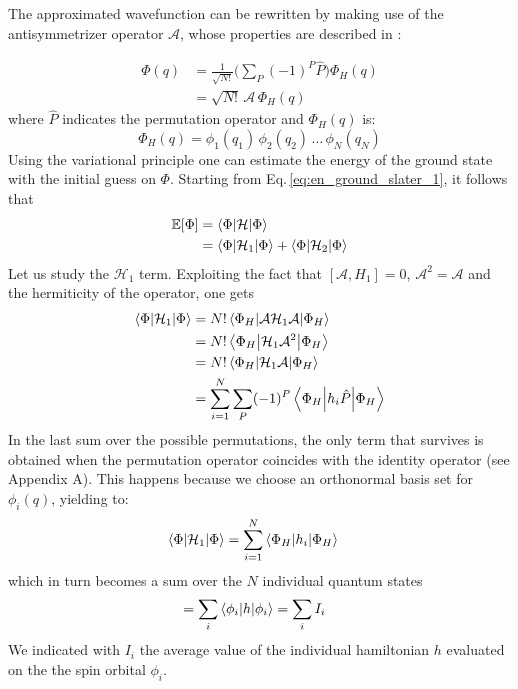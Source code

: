 The approximated wavefunction can be rewritten by making use of the antisymmetrizer operator $\mathcal{A}$, whose properties are described in \cite{bransden}:

\begin{equation}
\begin{aligned}
    \Phi(q) &= \frac{1}{\sqrt{N!}}\bigg(\sum_P (-1)^P \hat{P} \bigg) \Phi_H(q) \\
     &= \sqrt{N!} \, \mathcal{A} \, \Phi_H(q)
\end{aligned}
\label{eq:slater_determinant}
\end{equation}
where $\hat{P}$ indicates the permutation operator and $\Phi_H(q)$ is:
\begin{equation*}
    \Phi_H(q) = \phi_1(q_1) \, \phi_2(q_2) \, \dots \, \phi_N(q_N)  
\end{equation*}
Using the variational principle one can estimate the energy of the ground state with the initial guess on $\Phi$. Starting from Eq.\,\ref{eq:en_ground_slater_1}, it follows that
\begin{align*}
    \mathbb{E}[\Phi] &= \bracketOP{\Phi}{\Phi}{\mathcal{H}} \\
    &= \bracketOP{\Phi}{\Phi}{\mathcal{H}_1} + \bracketOP{\Phi}{\Phi}{\mathcal{H}_2}
\end{align*}
Let us study the $\mathcal{H}_1$ term. Exploiting the fact that $[\mathcal{A}, H_1]=0$, $\mathcal{A}^2 = \mathcal{A}$ and the hermiticity of the operator, one gets 
\begin{align*}
    \bracketOP{\Phi}{\Phi}{\mathcal{H}_1} &= N! \bracketOP{\Phi_H}{\Phi_H}{\mathcal{A}\mathcal{H}_1 \mathcal{A}} \\
    &= N! \bracketOP{\Phi_H}{\Phi_H}{\mathcal{H}_1\mathcal{A}^2} \\
    &= N! \bracketOP{\Phi_H}{\Phi_H}{\mathcal{H}_1\mathcal{A}} \\
    &= \sum_{i=1}^N \sum_P (-1)^P \bracketOP{\Phi_H}{\Phi_H}{h_i\hat{P}} 
\end{align*}
In the last sum over the possible permutations, the only term that survives is obtained when the permutation operator coincides with the identity operator (see Appendix A). This happens because we choose an orthonormal basis set for $\phi_i(q)$, yielding to: 
\begin{align}
    \bracketOP{\Phi}{\Phi}{\mathcal{H}_1} &= \sum_{i=1}^N  \bracketOP{\Phi_H}{\Phi_H}{h_i}
    \label{eq:permutation_to_identity}
\end{align}
which in turn becomes a sum over the $N$ individual quantum states
\begin{align*}
    &= \sum_{i} \bracketOP{\phi_i}{\phi_i}{h} = \sum_{i} I_i
\end{align*}
We indicated with $I_i$ the average value of the individual hamiltonian $h$ evaluated on the the spin orbital $\phi_i$.

